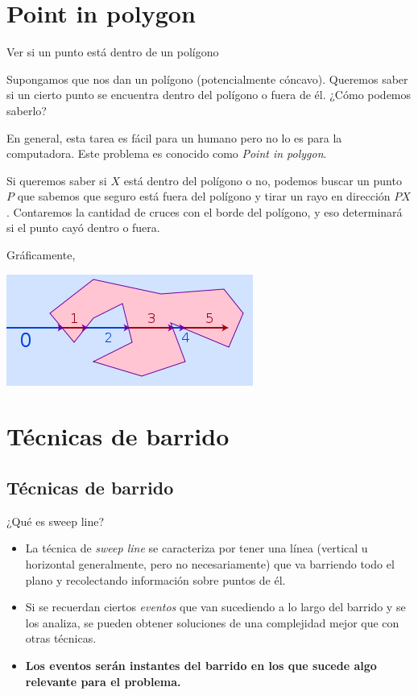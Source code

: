 \documentclass[compress]{beamer}
\begin{document}
\section{Point in polygon}
\begin{frame}{Ver si un punto está dentro de un polígono}

Supongamos que nos dan un polígono (potencialmente cóncavo). Queremos
saber si un cierto punto se encuentra dentro del polígono o fuera de él.
¿Cómo podemos saberlo? 

En general, esta tarea es fácil para un humano pero no lo es para la
computadora. Este problema es conocido como \textit{Point in polygon}. 
\end{frame}

\begin{frame}
Si queremos saber si $X$ está dentro del polígono o no, podemos
buscar un punto $P$ que sabemos que seguro está fuera del polígono
y tirar un rayo en dirección $PX$. Contaremos la cantidad de cruces con
el borde del polígono, y eso determinará si el punto cayó dentro o fuera.

Gráficamente,

\begin{center}
\includegraphics[scale=0.6]{images/point_in_poly.png}
\end{center}

\end{frame}

\section{T\'ecnicas de barrido}

\subsection{T\'ecnicas de barrido}
\begin{frame}{¿Qu\'e es sweep line?}
\begin{itemize}
\item La t\'ecnica de \emph{sweep line} se caracteriza por tener una l\'inea (vertical u horizontal generalmente, pero no necesariamente) que va barriendo todo el plano y recolectando informaci\'on sobre puntos de \'el.

\bigskip 
%
\item Si se recuerdan ciertos {\it eventos} que van sucediendo a lo largo del barrido y se los analiza, se pueden obtener soluciones de una complejidad mejor que con otras t\'ecnicas.
\bigskip
\item \textbf{Los eventos ser\'an instantes del barrido en los que sucede algo relevante para el problema.}
\end{itemize}
\end{frame}
\end{document}

